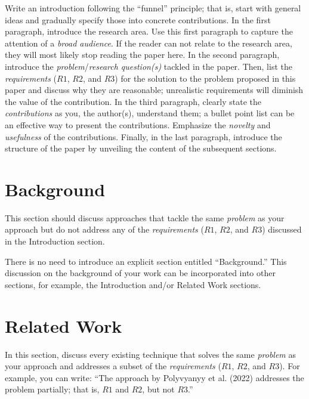 Write an introduction following the ``funnel'' principle; that is, start with general ideas and gradually specify those into concrete contributions. In the first paragraph, introduce the research area. Use this first paragraph to capture the attention of a \emph{broad audience}. If the reader can not relate to the research area, they will most likely stop reading the paper here. In the second paragraph, introduce the \emph{problem}/\emph{research question(s)} tackled in the paper. Then, list the \emph{requirements} ($R1$, $R2$, and $R3$) for the solution to the problem proposed in this paper and discuss why they are reasonable; unrealistic requirements will diminish the value of the contribution. In the third paragraph, clearly state the \emph{contributions} as you, the author(s), understand them; a bullet point list can be an effective way to present the contributions. Emphasize the \emph{novelty} and \emph{usefulness} of the contributions. Finally, in the last paragraph, introduce the structure of the paper by unveiling the content of the subsequent sections.

\section{Background}
\label{sec:background}

This section should discuss approaches that tackle the same \emph{problem} as your approach but do not address any of the \emph{requirements} ($R1$, $R2$, and $R3$) discussed in the Introduction section.

There is no need to introduce an explicit section entitled ``Background.''
This discussion on the background of your work can be incorporated into other sections, for example, the Introduction and/or Related Work sections.

\section{Related Work}
\label{sec:related:work}

In this section, discuss every existing technique that solves the same \emph{problem} as your approach and addresses a subset of the \emph{requirements} ($R1$, $R2$, and $R3$).
For example, you can write: ``The approach by Polyvyanyy et al. (2022) addresses the problem partially; that is, $R1$ and $R2$, but not $R3$.''

